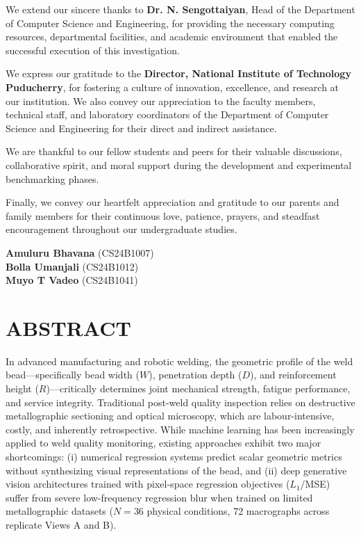 \documentclass[12pt,a4paper,oneside]{report}
\newcommand{\studentNameA}{Amuluru Bhavana}
\newcommand{\studentRollA}{CS24B1007}
\newcommand{\studentNameB}{Bolla Umanjali}
\newcommand{\studentRollB}{CS24B1012}
\newcommand{\studentNameC}{Muyo T Vadeo}
\newcommand{\studentRollC}{CS24B1041}
\newcommand{\hodName}{Dr. N. Sengottaiyan}
\begin{document}
We extend our sincere thanks to \textbf{\hodName}, Head of the Department of Computer Science and Engineering, for providing the necessary computing resources, departmental facilities, and academic environment that enabled the successful execution of this investigation.

We express our gratitude to the \textbf{Director, National Institute of Technology Puducherry}, for fostering a culture of innovation, excellence, and research at our institution. We also convey our appreciation to the faculty members, technical staff, and laboratory coordinators of the Department of Computer Science and Engineering for their direct and indirect assistance.

We are thankful to our fellow students and peers for their valuable discussions, collaborative spirit, and moral support during the development and experimental benchmarking phases.

Finally, we convey our heartfelt appreciation and gratitude to our parents and family members for their continuous love, patience, prayers, and steadfast encouragement throughout our undergraduate studies.

\vspace{20mm}\hfill
\begin{minipage}[t]{0.45\textwidth}\raggedright
\textbf{\studentNameA} (\studentRollA)\\[1mm]
\textbf{\studentNameB} (\studentRollB)\\[1mm]
\textbf{\studentNameC} (\studentRollC)
\end{minipage}
\clearpage

\chapter*{\centering ABSTRACT}
\vspace{6mm}

In advanced manufacturing and robotic welding, the geometric profile of the weld bead---specifically bead width ($W$), penetration depth ($D$), and reinforcement height ($R$)---critically determines joint mechanical strength, fatigue performance, and service integrity. Traditional post-weld quality inspection relies on destructive metallographic sectioning and optical microscopy, which are labour-intensive, costly, and inherently retrospective. While machine learning has been increasingly applied to weld quality monitoring, existing approaches exhibit two major shortcomings: (i) numerical regression systems predict scalar geometric metrics without synthesizing visual representations of the bead, and (ii) deep generative vision architectures trained with pixel-space regression objectives ($L_1$/MSE) suffer from severe low-frequency regression blur when trained on limited metallographic datasets ($N=36$ physical conditions, 72 macrographs across replicate Views A and B).
\end{document}

